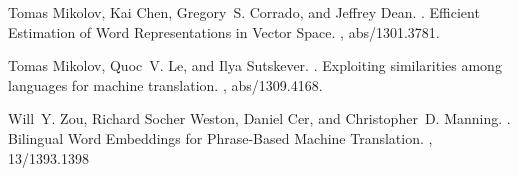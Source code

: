 \def\DevnagVersion{2.15}\documentclass[11pt]{article}
\begin{document}
\begin{thebibliography}{40}
Tomas Mikolov, Kai Chen, Gregory~S. Corrado, and Jeffrey Dean.
.
\newblock Efficient Estimation of Word Representations in Vector Space.
,
  abs/1301.3781.

Tomas Mikolov, Quoc~V. Le, and Ilya Sutskever.
.
\newblock Exploiting similarities among languages for machine translation.
,
  abs/1309.4168.
   

Will~Y. Zou, Richard Socher Weston, Daniel Cer, and Christopher~D. Manning.
.
\newblock Bilingual Word Embeddings for Phrase-Based Machine Translation.
,
   13/1393.1398
   
\end{thebibliography}
\end{document}
